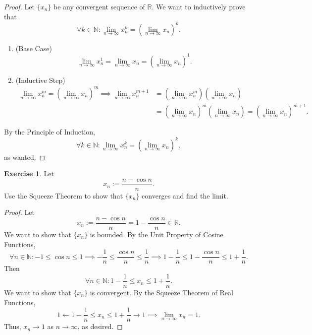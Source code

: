 \documentclass[12pt]{article}
\theoremstyle{definition}
\newtheorem{exercise}{Exercise}
\begin{document}
\begin{proof}
    Let $\{x_n\}$ be any convergent sequence of $\mathbb{R}$. We want to inductively prove that 
    \[
        \forall k \in \mathbb{N} : \lim_{n \to \infty}x_n^k = \left(\lim_{n \to \infty}x_n\right)^k.
    \]
    \begin{enumerate}[label=\arabic*)]
        \item (Base Case)
        \[
            \lim_{n \to \infty}x_n^1 = \lim_{n \to \infty}x_n = \left(\lim_{n \to \infty}x_n\right)^1.
        \]
        \item (Inductive Step)
        \begin{align*}
            \lim_{n \to \infty}x_n^m = \left(\lim_{n \to \infty}x_n\right)^m \implies \lim_{n \to \infty}x_n^{m + 1} &= \left(\lim_{n \to \infty}x_n^m\right)\left(\lim_{n \to \infty}x_n\right) \\
            &= \left(\lim_{n \to \infty}x_n\right)^m\left(\lim_{n \to \infty}x_n\right) = \left(\lim_{n \to \infty}x_n\right)^{m + 1}.
        \end{align*}
    \end{enumerate}
    By the Principle of Induction,
    \[
        \forall k \in \mathbb{N} : \lim_{n \to \infty}x_n^k = \left(\lim_{n \to \infty}x_n\right)^k,
    \]
    as wanted.
\end{proof}

\begin{exercise}
    Let 
    \[
        x_n := \frac{n - \cos n}{n}.
    \]
    Use the Squeeze Theorem to show that $\{x_n\}$ converges and find the limit.
\end{exercise}

\begin{proof}
    Let
    \[
        x_n := \frac{n - \cos n}{n} = 1 - \frac{\cos n}{n} \in \mathbb{R}.
    \]
    We want to show that $\{x_n\}$ is bounded. By the Unit Property of Cosine Functions,
    \[
        \forall n \in \mathbb{N}: -1 \leq \cos n \leq 1 \implies -\frac{1}{n} \leq \frac{\cos n}{n} \leq \frac{1}{n} \implies 1 - \frac{1}{n} \leq 1 - \frac{\cos n}{n} \leq 1 + \frac{1}{n}.
    \]
    Then
    \[
        \forall n \in \mathbb{N} : 1 - \frac{1}{n} \leq x_n \leq 1 + \frac{1}{n}.
    \]
    We want to show that $\{x_n\}$ is convergent. By the Squeeze Theorem of Real Functions,
    \[
        1 \leftarrow 1 - \frac{1}{n} \leq x_n \leq 1 + \frac{1}{n} \rightarrow 1 \implies \lim_{n \to \infty}x_n = 1.
    \]
    Thus, $x_n \to 1$ as $n \to \infty$, as desired.
\end{proof}
\end{document}
